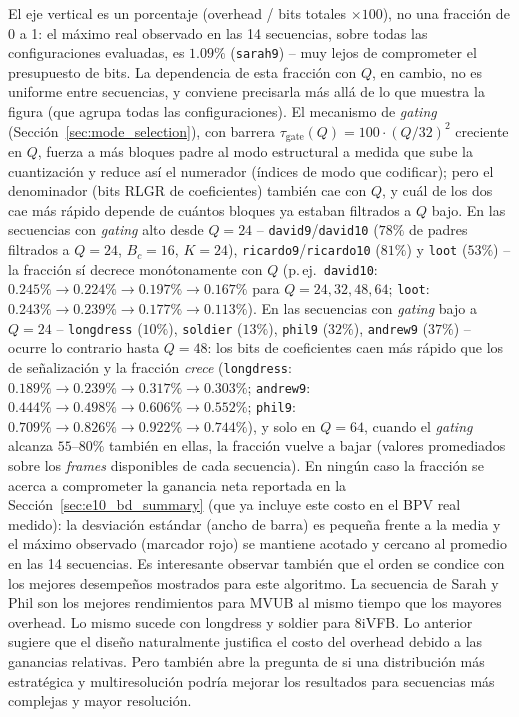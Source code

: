         El eje vertical es un porcentaje (overhead / bits totales $\times 100$), no una fracción
        de 0 a 1: el máximo real observado en las 14 secuencias, sobre todas las configuraciones
        evaluadas, es $1.09\%$ (\texttt{sarah9}) -- muy lejos de comprometer el presupuesto de
        bits. La dependencia de esta fracción con $Q$, en cambio, no es uniforme entre
        secuencias, y conviene precisarla más allá de lo que muestra la figura (que agrupa
        todas las configuraciones). El mecanismo de \textit{gating}
        (Sección~\ref{sec:mode_selection}), con barrera $\tau_{\text{gate}}(Q)=100\cdot(Q/32)^2$
        creciente en $Q$, fuerza a más bloques padre al modo estructural a medida que sube la
        cuantización y reduce así el numerador (índices de modo que codificar); pero el
        denominador (bits RLGR de coeficientes) también cae con $Q$, y cuál de los dos cae más
        rápido depende de cuántos bloques ya estaban filtrados a $Q$ bajo. En las secuencias con
        \textit{gating} alto desde $Q=24$ -- \texttt{david9}/\texttt{david10} ($78\%$ de padres
        filtrados a $Q=24$, $B_c=16$, $K=24$), \texttt{ricardo9}/\texttt{ricardo10} ($81\%$) y
        \texttt{loot} ($53\%$) -- la fracción sí decrece monótonamente con $Q$ (p.\,ej.\
        \texttt{david10}: $0.245\%\to0.224\%\to0.197\%\to0.167\%$ para $Q=24,32,48,64$;
        \texttt{loot}: $0.243\%\to0.239\%\to0.177\%\to0.113\%$). En las secuencias con
        \textit{gating} bajo a $Q=24$ -- \texttt{longdress} ($10\%$), \texttt{soldier} ($13\%$),
        \texttt{phil9} ($32\%$), \texttt{andrew9} ($37\%$) -- ocurre lo contrario hasta $Q=48$:
        los bits de coeficientes caen más rápido que los de señalización y la fracción
        \emph{crece} (\texttt{longdress}: $0.189\%\to0.239\%\to0.317\%\to0.303\%$;
        \texttt{andrew9}: $0.444\%\to0.498\%\to0.606\%\to0.552\%$; \texttt{phil9}:
        $0.709\%\to0.826\%\to0.922\%\to0.744\%$), y solo en $Q=64$, cuando el \textit{gating}
        alcanza $55$--$80\%$ también en ellas, la fracción vuelve a bajar (valores promediados
        sobre los \textit{frames} disponibles de cada secuencia). En ningún caso la fracción se
        acerca a comprometer la ganancia neta reportada en la Sección~\ref{sec:e10_bd_summary}
        (que ya incluye este costo en el BPV real medido): la desviación estándar (ancho de
        barra) es pequeña frente a la media y el máximo observado (marcador rojo) se mantiene
        acotado y cercano al promedio en las 14 secuencias.
	Es interesante observar también que el orden se condice con los mejores desempeños mostrados para este algoritmo. La secuencia de Sarah y Phil son los mejores rendimientos para MVUB al mismo tiempo que los mayores overhead. Lo mismo sucede con longdress y soldier para 8iVFB. Lo anterior sugiere que el diseño naturalmente justifica el costo del overhead debido a las ganancias relativas. Pero también abre la pregunta de si una distribución más estratégica y multiresolución podría mejorar los resultados para secuencias más complejas y mayor resolución.


